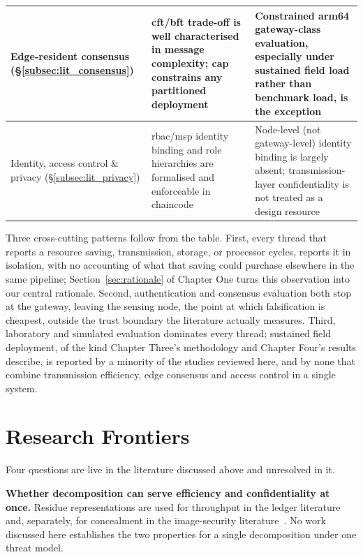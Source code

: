 \documentclass[12pt,a4paper,oneside]{book}
\begin{document}
\begin{table}[htbp]
\begin{tabularx}{\textwidth}{@{}p{}X X@{}}
\midrule
Edge-resident consensus (\S\ref{subsec:lit_consensus})
  & \gls{cft}/\gls{bft} trade-off is well characterised in message
    complexity; \gls{cap} constrains any partitioned deployment
  & Constrained \gls{arm64} gateway-class evaluation, especially under
    sustained field load rather than benchmark load, is the exception \\
\midrule
Identity, access control \& privacy (\S\ref{subsec:lit_privacy})
  & \gls{rbac}/\gls{msp} identity binding and role hierarchies are
    formalised and enforceable in chaincode
  & Node-level (not gateway-level) identity binding is largely absent;
    transmission-layer confidentiality is not treated as a design resource \\
\bottomrule
\end{tabularx}
\end{table}

Three cross-cutting patterns follow from the table. First, every thread
that reports a resource saving, transmission, storage, or processor
cycles, reports it in isolation, with no accounting of what that saving
could purchase elsewhere in the same pipeline; Section~\ref{sec:rationale}
of Chapter One turns this observation into our central rationale.
Second, authentication and consensus evaluation both stop at the gateway,
leaving the sensing node, the point at which falsification is cheapest,
outside the trust boundary the literature actually measures. Third,
laboratory and simulated evaluation dominates every thread; sustained
field deployment, of the kind Chapter Three's methodology and Chapter
Four's results describe, is reported by a minority of the studies
reviewed here, and by none that combine transmission efficiency, edge
consensus and access control in a single system.

\section{Research Frontiers}
\label{sec:lit_frontiers}

Four questions are live in the literature discussed above and unresolved in it.

\textbf{Whether decomposition can serve efficiency and confidentiality at
once.} Residue representations are used for throughput in the ledger
literature~\cite{horvath2025assistedsharding, patel2023blockchainlayer} and,
separately, for concealment in the image-security
literature~\cite{yavuz2025reversibledata}. No work discussed here establishes
the two properties for a single decomposition under one threat model.
\end{document}
